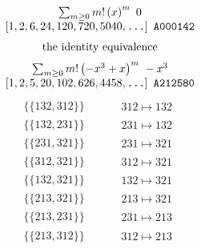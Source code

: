 \allowdisplaybreaks
\begin{tiny}
$$
\begin{matrix}
\sum_{m \geq 0} m! \left(
x
\right)^m
\ 
0
\\
\left[1, 2, 6, 24, 120, 720, 5040, \text{\texttt{...}}\right]
\ 
\texttt{A000142}
\end{matrix}
$$
\vspace{-1em}
\begin{align}
\textnormal{the identity equivalence}
\end{align}
$$
\begin{matrix}
\sum_{m \geq 0} m! \left(
-x^{3} + x
\right)^m
\ 
-x^{3}
\\
\left[1, 2, 5, 20, 102, 626, 4458, \text{\texttt{...}}\right]
\ 
\texttt{A212580}
\end{matrix}
$$
\vspace{-1em}
\begin{align}
\{\{132, 312\}\}
\quad
&
\phantom{.}
&
\begin{matrix}
312 \mapsto 132
\end{matrix}
\\
\{\{132, 231\}\}
\quad
&
\phantom{.}
&
\begin{matrix}
231 \mapsto 132
\end{matrix}
\\
\{\{231, 321\}\}
\quad
&
\phantom{.}
&
\begin{matrix}
231 \mapsto 321
\end{matrix}
\\
\{\{312, 321\}\}
\quad
&
\phantom{.}
&
\begin{matrix}
312 \mapsto 321
\end{matrix}
\\
\{\{132, 321\}\}
\quad
&
\phantom{.}
&
\begin{matrix}
132 \mapsto 321
\end{matrix}
\\
\{\{213, 321\}\}
\quad
&
\phantom{.}
&
\begin{matrix}
213 \mapsto 321
\end{matrix}
\\
\{\{213, 231\}\}
\quad
&
\phantom{.}
&
\begin{matrix}
231 \mapsto 213
\end{matrix}
\\
\{\{213, 312\}\}
\quad
&
\phantom{.}
&
\begin{matrix}
312 \mapsto 213
\end{matrix}
\\

\end{align}
\end{tiny}
